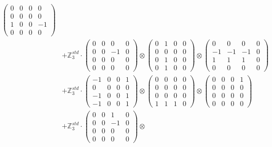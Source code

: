 \documentclass{article}
\begin{document}
{\begin{align}
            \begin{pmatrix} 0 & 0 & 0 & 0 \\ 0 & 0 & 0 & 0 \\ 1 & 0 & 0 & -1 \\ 0 & 0 & 0 & 0 \end{pmatrix} \\ 
        &+ \label{Rs16-Rc11-Solution-8-c25} \mathbb{Z}_3^{std} \cdot 
            \begin{pmatrix} 0 & 0 & 0 & 0 \\ 0 & 0 & -1 & 0 \\ 0 & 0 & 0 & 0 \\ 0 & 0 & 0 & 0 \end{pmatrix} \otimes 
            \begin{pmatrix} 0 & 1 & 0 & 0 \\ 0 & 0 & 0 & 0 \\ 0 & 1 & 0 & 0 \\ 0 & 1 & 0 & 0 \end{pmatrix} \otimes 
            \begin{pmatrix} 0 & 0 & 0 & 0 \\ -1 & -1 & -1 & 0 \\ 1 & 1 & 1 & 0 \\ 0 & 0 & 0 & 0 \end{pmatrix} \\ 
        &+ \label{Rs16-Rc11-Solution-8-c26} \mathbb{Z}_3^{std} \cdot 
            \begin{pmatrix} -1 & 0 & 0 & 1 \\ 0 & 0 & 0 & 0 \\ -1 & 0 & 0 & 1 \\ -1 & 0 & 0 & 1 \end{pmatrix} \otimes 
            \begin{pmatrix} 0 & 0 & 0 & 0 \\ 0 & 0 & 0 & 0 \\ 0 & 0 & 0 & 0 \\ 1 & 1 & 1 & 0 \end{pmatrix} \otimes 
            \begin{pmatrix} 0 & 0 & 0 & 1 \\ 0 & 0 & 0 & 0 \\ 0 & 0 & 0 & 0 \\ 0 & 0 & 0 & 0 \end{pmatrix} \\ 
        &+ \label{Rs16-Rc11-Solution-8-c27} \mathbb{Z}_3^{std} \cdot 
            \begin{pmatrix} 0 & 0 & 1 & 0 \\ 0 & 0 & -1 & 0 \\ 0 & 0 & 0 & 0 \\ 0 & 0 & 0 & 0 \end{pmatrix} \otimes 

\end{align}}
\end{document}
